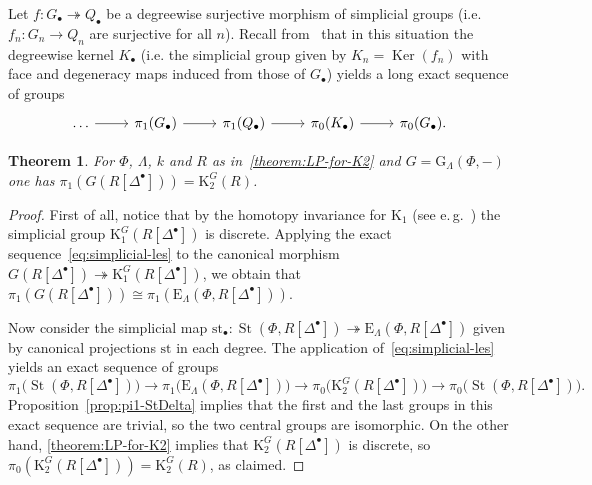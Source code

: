 \documentclass[oneside, 11pt]{amsart}
\numberwithin{equation}{section}
\newtheorem{theorem}[lemma]{Theorem}
\newcommand{\Ker}{\mathop{\mathrm{Ker}}\nolimits}
\newcommand{\K}{{\mathrm{K}}}
\newcommand{\St}{\mathop{\mathrm{St}}\nolimits}
\newcommand{\E}{\mathrm{E}}
\theoremstyle{definition}
\theoremstyle{definition}
\theoremstyle{remark}
\begin{document}
Let $f\colon G_\bullet\twoheadrightarrow Q_\bullet$ be a degreewise surjective morphism of simplicial groups (i.e. $f_n\colon G_n\to Q_n$ are surjective for all $n$). Recall from~\cite[Theorem~1.3]{Ina75} that in this situation the degreewise kernel $K_\bullet$ (i.e. the simplicial group given by $K_n = \Ker(f_n)$ with face and degeneracy maps induced from those of $G_\bullet$) yields a long exact sequence of groups
\begin{equation} \label{eq:simplicial-les} \begin{tikzcd} \ldots \ar{r} & \pi_{1}(G_\bullet) \ar{r} & \pi_1(Q_\bullet) \ar{r} & \pi_0(K_\bullet) \ar{r} & \pi_0(G_\bullet). \end{tikzcd} \end{equation}

\begin{theorem} \label{theorem:pi1-GRDelta}
 For $\Phi$, $\Lambda$, $k$ and $R$ as in~\cref{theorem:LP-for-K2} and $G = \mathrm{G}_\Lambda(\Phi, -)$ one has $\pi_1(G(R[\Delta^\bullet])) = \K_2^G(R)$.
\end{theorem}
\begin{proof}
First of all, notice that by the homotopy invariance for $\K_1$ (see e.\,g.~\cite[Theorem~1.1]{Sta20}) the simplicial group $\K_1^G(R[\Delta^\bullet])$ is discrete. Applying the exact sequence~\eqref{eq:simplicial-les} to the canonical morphism $G(R[\Delta^\bullet]) \twoheadrightarrow \K_1^G(R[\Delta^\bullet])$, we obtain that $\pi_1(G( R[\Delta^\bullet])) \cong \pi_1(\E_\Lambda(\Phi, R[\Delta^\bullet]))$.

Now consider the simplicial map $\mathrm{st}_\bullet \colon \St(\Phi, R[\Delta^\bullet]) \twoheadrightarrow \E_\Lambda(\Phi, R[\Delta^\bullet])$ given by canonical projections $\mathrm{st}$ in each degree. The application of~\eqref{eq:simplicial-les} yields an exact sequence of groups
\[
\pi_1\bigl(\St(\Phi, R[\Delta^\bullet])\bigr) \to \pi_1\bigl(\E_\Lambda(\Phi, R[\Delta^\bullet])\bigr) \to \pi_0\bigl(\K_2^G( R[\Delta^\bullet])\bigr) \to \pi_0\bigl(\St(\Phi, R[\Delta^\bullet])\bigr).
\]
 Proposition~\ref{prop:pi1-StDelta} implies that the first and the last groups in this exact sequence are trivial, so the two central groups are isomorphic. On the other hand, \cref{theorem:LP-for-K2} implies that $\K_2^G(R[\Delta^\bullet])$ is discrete, so $\pi_0(\K_2^G(R[\Delta^\bullet])) = \K_2^G(R)$, as claimed.
\end{proof}
\end{document}
